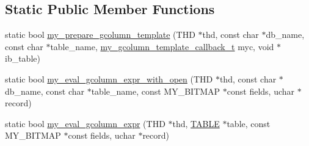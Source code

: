 \subsection*{Static Public Member Functions}
\begin{DoxyCompactItemize}
\item 
static bool \mbox{\hyperlink{classhandler_aa6c449e2194c590eb53b6a6b5dbb362c}{my\+\_\+prepare\+\_\+gcolumn\+\_\+template}} (T\+HD $\ast$thd, const char $\ast$db\+\_\+name, const char $\ast$table\+\_\+name, \mbox{\hyperlink{classhandler_ad4c241e50948859d98ceae6e39066838}{my\+\_\+gcolumn\+\_\+template\+\_\+callback\+\_\+t}} myc, void $\ast$ib\+\_\+table)
\item 
static bool \mbox{\hyperlink{classhandler_a32dd6a07c4f58be3273576d0cc813933}{my\+\_\+eval\+\_\+gcolumn\+\_\+expr\+\_\+with\+\_\+open}} (T\+HD $\ast$thd, const char $\ast$db\+\_\+name, const char $\ast$table\+\_\+name, const M\+Y\+\_\+\+B\+I\+T\+M\+AP $\ast$const fields, uchar $\ast$record)
\item 
static bool \mbox{\hyperlink{classhandler_a39b30a208b304f519e8d74070a41ac19}{my\+\_\+eval\+\_\+gcolumn\+\_\+expr}} (T\+HD $\ast$thd, \mbox{\hyperlink{structTABLE}{T\+A\+B\+LE}} $\ast$table, const M\+Y\+\_\+\+B\+I\+T\+M\+AP $\ast$const fields, uchar $\ast$record)
\end{DoxyCompactItemize}
